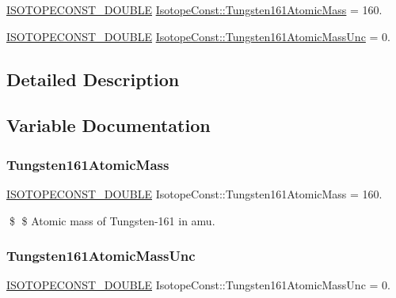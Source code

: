 \begin{DoxyCompactItemize}
\item 
\mbox{\hyperlink{group___isotope_const-_macros_ga8f45a7272ce02c0b4c65c44636ed719a}{I\+S\+O\+T\+O\+P\+E\+C\+O\+N\+S\+T\+\_\+\+D\+O\+U\+B\+LE}} \mbox{\hyperlink{group___isotope_const-_tungsten-_w161_ga41d229473fcc5de0bdd247f7dc4b2ae5}{Isotope\+Const\+::\+Tungsten161\+Atomic\+Mass}} = 160.
\item 
\mbox{\hyperlink{group___isotope_const-_macros_ga8f45a7272ce02c0b4c65c44636ed719a}{I\+S\+O\+T\+O\+P\+E\+C\+O\+N\+S\+T\+\_\+\+D\+O\+U\+B\+LE}} \mbox{\hyperlink{group___isotope_const-_tungsten-_w161_ga039abe2adf83ef56db749d5699b02995}{Isotope\+Const\+::\+Tungsten161\+Atomic\+Mass\+Unc}} = 0.
\end{DoxyCompactItemize}


\subsection{Detailed Description}


\subsection{Variable Documentation}
\mbox{\label{group___isotope_const-_tungsten-_w161_ga41d229473fcc5de0bdd247f7dc4b2ae5}} 
\subsubsection{\texorpdfstring{Tungsten161\+Atomic\+Mass}{Tungsten161AtomicMass}}
{\footnotesize\ttfamily \mbox{\hyperlink{group___isotope_const-_macros_ga8f45a7272ce02c0b4c65c44636ed719a}{I\+S\+O\+T\+O\+P\+E\+C\+O\+N\+S\+T\+\_\+\+D\+O\+U\+B\+LE}} Isotope\+Const\+::\+Tungsten161\+Atomic\+Mass = 160.}

\$ \$ Atomic mass of Tungsten-\/161 in amu. \mbox{\label{group___isotope_const-_tungsten-_w161_ga039abe2adf83ef56db749d5699b02995}} 
\subsubsection{\texorpdfstring{Tungsten161\+Atomic\+Mass\+Unc}{Tungsten161AtomicMassUnc}}
{\footnotesize\ttfamily \mbox{\hyperlink{group___isotope_const-_macros_ga8f45a7272ce02c0b4c65c44636ed719a}{I\+S\+O\+T\+O\+P\+E\+C\+O\+N\+S\+T\+\_\+\+D\+O\+U\+B\+LE}} Isotope\+Const\+::\+Tungsten161\+Atomic\+Mass\+Unc = 0.}

